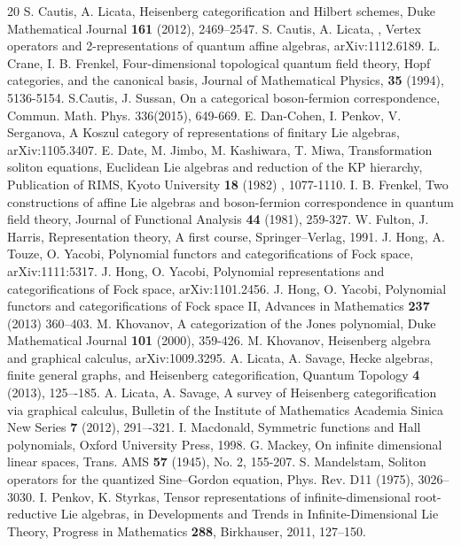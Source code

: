 \documentclass[11pt]{amsart}
\begin{document}
\begin{thebibliography}{20}
 S. Cautis, A. Licata, Heisenberg categorification and Hilbert schemes, Duke Mathematical Journal
 \textbf{161} (2012), 2469--2547.
 S. Cautis, A. Licata, , Vertex operators and 2-representations of quantum affine algebras, arXiv:1112.6189.
 L. Crane, I. B. Frenkel, Four-dimensional topological quantum field theory, Hopf categories, and the canonical basis, Journal of Mathematical 
Physics, \textbf{35} (1994), 5136-5154.
 S.Cautis, J. Sussan, On a categorical boson-fermion correspondence, Commun. Math. Phys. 336(2015), 649-669.
 E. Dan-Cohen, I. Penkov, V. Serganova, A Koszul category of representations of finitary Lie algebras, arXiv:1105.3407.
 E. Date, M. Jimbo, M. Kashiwara, T. Miwa, Transformation soliton equations, Euclidean Lie algebras and reduction of the KP hierarchy, 
Publication of RIMS, Kyoto University \textbf{18} (1982) , 1077-1110.
 I. B. Frenkel, Two constructions of affine Lie algebras and boson-fermion correspondence in quantum field theory, Journal of Functional Analysis \textbf{44} (1981), 259-327.
 W. Fulton, J. Harris, Representation theory, A first course, Springer--Verlag, 1991.
 J. Hong, A. Touze, O. Yacobi, Polynomial functors and categorifications of Fock space, arXiv:1111:5317.
 J. Hong, O. Yacobi, Polynomial representations and categorifications of Fock space, arXiv:1101.2456.
 J. Hong, O. Yacobi, Polynomial functors and categorifications of Fock space II, Advances in Mathematics {\bf 237} (2013) 360--403.         
 M. Khovanov, A categorization of the Jones polynomial, Duke Mathematical Journal \textbf{101} (2000), 359-426.
 M. Khovanov, Heisenberg algebra and graphical calculus, arXiv:1009.3295.
 A. Licata, A. Savage, Hecke algebras, finite general graphs, and Heisenberg categorification, Quantum Topology {\bf 4} (2013), 125–-185. 
 A. Licata, A. Savage, A survey of Heisenberg categorification via graphical calculus, 
Bulletin of the Institute of Mathematics Academia Sinica New Series {\bf 7} (2012), 291–-321. 
 I. Macdonald, Symmetric functions and Hall polynomials, Oxford University Press, 1998.
  G. Mackey, On infinite dimensional linear spaces, Trans. AMS \textbf{57} (1945), No. 2, 155-207.
  S. Mandelstam, Soliton operators for the quantized Sine--Gordon equation, Phys. Rev. D11 (1975), 3026--3030.
 I. Penkov, K. Styrkas, Tensor representations of infinite-dimensional root-reductive Lie algebras, 
in Developments and Trends in Infinite-Dimensional Lie Theory, Progress in Mathematics \textbf{288}, Birkhauser, 2011, 127--150.


\end{thebibliography}
\end{document}
